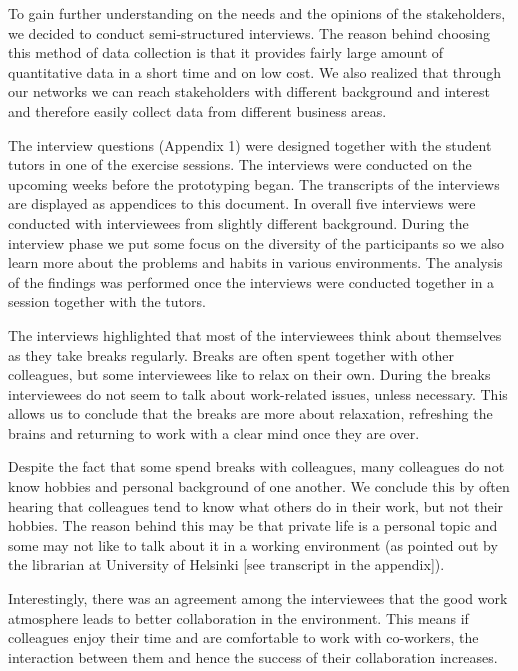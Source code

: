 To gain further understanding on the needs and the opinions of the stakeholders, we decided to conduct semi-structured interviews. The reason behind choosing this method of data collection is that it provides fairly large amount of quantitative data in a short time and on low cost. We also realized that through our networks we can reach stakeholders with different background and interest and therefore easily collect data from different business areas. 

The interview questions (Appendix 1) were designed together with the student tutors in one of the exercise sessions. The interviews were conducted on the upcoming weeks before the prototyping began. The transcripts of the interviews are displayed as appendices to this document. In overall five interviews were conducted with interviewees from slightly different background. During the interview phase we put some focus on the diversity of the participants so we also learn more about the problems and habits in various environments. The analysis of the findings was performed once the interviews were conducted together in a session together with the tutors.


 The interviews highlighted that most of the interviewees think about themselves as they take breaks regularly. Breaks are often spent together with other colleagues, but some interviewees like to relax on their own. During the breaks interviewees do not seem to talk about work-related issues, unless necessary. This allows us to conclude that the breaks are more about relaxation, refreshing the brains and returning to work with a clear mind once they are over. 

Despite the fact that some spend breaks with colleagues, many colleagues do not know hobbies and personal background of one another. We conclude this by often hearing that colleagues tend to know what others do in their work, but not their hobbies. The reason behind this may be that private life is a personal topic and some may not like to talk about it in a working environment (as pointed out by the librarian at University of Helsinki [see transcript in the appendix]). 

Interestingly, there was an agreement among the interviewees that the good work atmosphere leads to better collaboration in the environment. This means if colleagues enjoy their time and are comfortable to work with co-workers, the interaction between them and hence the success of their collaboration increases. 